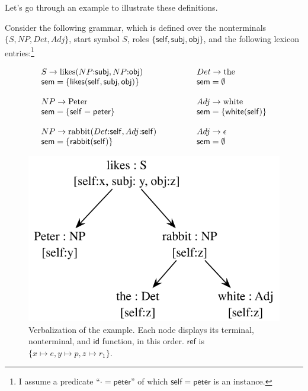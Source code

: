 \documentclass[11pt,a4]{article}
\newcommand{\self}{\mathsf{self}}
\newcommand{\Neq}{{:}}
\newcommand{\refr}{\mathsf{ref}}
\newcommand{\id}{\mathsf{id}}
\theoremstyle{plain}
\theoremstyle{definition}
\begin{document}
Let's go through an example to illustrate these definitions.

Consider the following grammar, which is defined over the nonterminals
$\{S, NP, Det, Adj\}$, start symbol $S$, roles $\{\self,
\mathsf{subj}, \mathsf{obj}\}$, and the following lexicon
entries:\footnote{I assume a predicate ``$\cdot = \mathsf{peter}$'' of
  which  $\self = \mathsf{peter}$ is an instance.}

$$\begin{array}{lp{1cm}l}
S \rightarrow \mathrm{likes}(NP \Neq \mathsf{subj}, NP \Neq
\mathsf{obj}) 
&&
Det \rightarrow \mathrm{the} \\
\mathsf{sem} = \{ \mathsf{likes}(\self, \mathsf{subj}, \mathsf{obj})
\} 
&&
\mathsf{sem} = \emptyset \\
&&\\
%
%
NP \rightarrow \mathrm{Peter} 
&&
Adj \rightarrow \mathrm{white} \\
\mathsf{sem} = \{ \self = \mathsf{peter} \}
&&
\mathsf{sem} = \{ \mathsf{white}(\self) \} \\
&&\\
%
%
NP \rightarrow \mathrm{rabbit}(Det \Neq \self, Adj \Neq \mathsf{self})
&&
Adj \rightarrow \epsilon \\
\mathsf{sem} = \{ \mathsf{rabbit}(\self) \}
&&
\mathsf{sem} = \emptyset
\end{array}
$$

\begin{figure}
  \centering
  \includegraphics[scale=0.6]{pic-rdg-crisp}
  \caption{Verbalization of the example. Each node displays its
    terminal, nonterminal, and $\id$ function, in this order. $\refr$
    is $\{x \mapsto e, y \mapsto p, z \mapsto r_1\}$.}
  \label{fig:rdg-crisp}
\end{figure}
\end{document}

